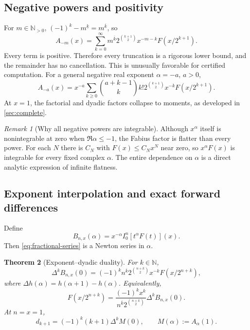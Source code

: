 \documentclass[11pt,oneside]{article}
\numberwithin{equation}{section}
\newtheorem{theorem}{Theorem}[section]
\theoremstyle{definition}
\theoremstyle{remark}
\newtheorem{remark}[theorem]{Remark}
\newcommand{\N}{\mathbb N}
\newcommand{\fall}[2]{#1^{\underline{#2}}}
\newcommand{\rise}[2]{#1^{\overline{#2}}}
\begin{document}
\subsection{Negative powers and positivity}

For $m\in\N_{>0}$, $(-1)^k\fall{-m}k=\rise mk$, so
\begin{equation}
 \boxed{
 A_{-m}(x)=\sum_{k=0}^{\infty}\rise mk
 2^{\binom{k+1}{2}}x^{-m-k}F(x/2^{k+1}).}
 \label{eq:negative-integer-series}
\end{equation}
Every term is positive.  Therefore every truncation is a rigorous lower bound, and the
remainder has no cancellation.  This is unusually favorable for certified computation.
For a general negative real exponent $\alpha=-a$, $a>0$,
\begin{equation}
 A_{-a}(x)=x^{-a}\sum_{k\ge0}\binom{a+k-1}{k}k!
 2^{\binom{k+1}{2}}x^{-k}F(x/2^{k+1}).                       \label{eq:negative-real-series}
\end{equation}
At $x=1$, the factorial and dyadic factors collapse to moments, as developed in
\cref{sec:complete}.

\begin{remark}[Why all negative powers are integrable]
Although $x^\alpha$ itself is nonintegrable at zero when $\Re\alpha\le-1$, the Fabius factor
is flatter than every power.  For each $N$ there is $C_N$ with $F(x)\le C_Nx^N$ near zero,
so $x^\alpha F(x)$ is integrable for every fixed complex $\alpha$.  The entire dependence on
$\alpha$ is a direct analytic expression of infinite flatness.
\end{remark}

\subsection{Exponent interpolation and exact forward differences}

Define
\begin{equation}
 B_{n,x}(\alpha)=x^{-\alpha}I_0^n[t^\alpha F(t)](x).           \label{eq:Bnx}
\end{equation}
Then \eqref{eq:fractional-series} is a Newton series in $\alpha$.

\begin{theorem}[Exponent--dyadic duality]
\label{thm:exponent-duality}
For $k\in\N$,
\begin{equation}
 \Delta^kB_{n,x}(0)
 =(-1)^k\rise nk2^{\binom{n+k}{2}}x^{-k}F(x/2^{n+k}),         \label{eq:forward-difference}
\end{equation}
where $\Delta h(\alpha)=h(\alpha+1)-h(\alpha)$.  Equivalently,
\begin{equation}
 \boxed{
 F(x/2^{n+k})=
 \frac{(-1)^kx^k}{\rise nk2^{\binom{n+k}{2}}}
 \Delta^kB_{n,x}(0).}
 \label{eq:recover-dyadic}
\end{equation}
At $n=x=1$,
\begin{equation}
 d_{k+1}=(-1)^k(k+1)\Delta^kM(0),\qquad
 M(\alpha):=A_\alpha(1).                                    \label{eq:mom-forward-diff}
\end{equation}
\end{theorem}
\end{document}
